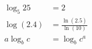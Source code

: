 \begin{align}
  \log_5 25 &= 2\\
  \log(2.4) &= \frac{\ln(2.5)}{\ln(10)}\\
  a \log_b c &= \log_{b} c^a
\end{align}
